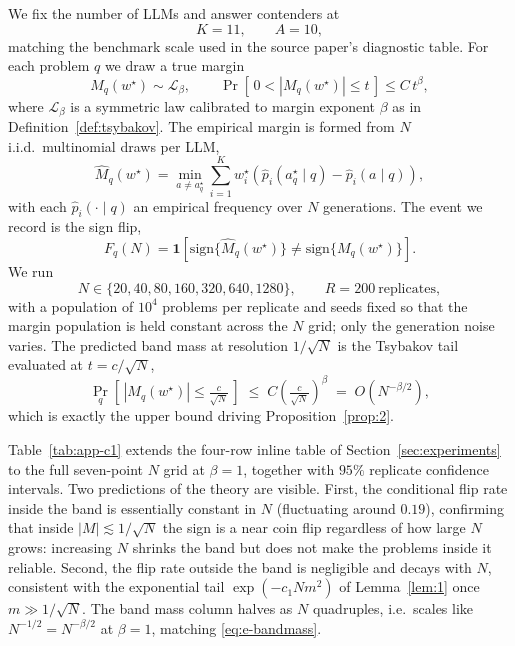 \documentclass{article} %
\providecommand{\phat}{\widehat{p}}
\providecommand{\Mhat}{\widehat{M}}
\providecommand{\wstar}{w^{\star}}
\providecommand{\sign}{\mathrm{sign}}
\begin{document}
We fix the number of LLMs and answer contenders at
\begin{equation}
\label{eq:e-c1-K}
K=11,
\qquad
A=10,
\end{equation}
matching the benchmark scale used in the source paper's diagnostic table.
For each problem $q$ we draw a true margin
\begin{equation}
\label{eq:e-c1-margin-law}
M_q(\wstar)\sim \mathcal{L}_\beta,
\qquad
\Pr\!\left[\,0<|M_q(\wstar)|\le t\,\right]\le C\,t^\beta,
\end{equation}
where $\mathcal{L}_\beta$ is a symmetric law calibrated to margin exponent
$\beta$ as in Definition~\ref{def:tsybakov}.  The empirical margin is formed
from $N$ i.i.d.\ multinomial draws per LLM,
\begin{equation}
\label{eq:e-c1-empirical}
\Mhat_q(\wstar)=\min_{a\ne a_q^\star}
\sum_{i=1}^K \wstar_i
\left(\phat_i(a_q^\star\mid q)-\phat_i(a\mid q)\right),
\end{equation}
with each $\phat_i(\cdot\mid q)$ an empirical frequency over $N$ generations.
The event we record is the sign flip,
\begin{equation}
\label{eq:e-c1-flip}
F_q(N)=
\mathbf 1\!\left[\sign\{\Mhat_q(\wstar)\}\ne\sign\{M_q(\wstar)\}\right].
\end{equation}
We run
\begin{equation}
\label{eq:e-c1-grid}
N\in\{20,40,80,160,320,640,1280\},
\qquad
R=200\ \text{replicates},
\end{equation}
with a population of $10^4$ problems per replicate and seeds fixed so that
the margin population is held constant across the $N$ grid; only the
generation noise varies.  The predicted band mass at resolution $1/\sqrt N$ is
the Tsybakov tail evaluated at $t=c/\sqrt N$,
\begin{equation}
\label{eq:e-bandmass}
\Pr_q\!\left[\,|M_q(\wstar)|\le \tfrac{c}{\sqrt N}\,\right]
\;\le\;
C\left(\tfrac{c}{\sqrt N}\right)^{\beta}
\;=\;
O\!\left(N^{-\beta/2}\right),
\end{equation}
which is exactly the upper bound driving Proposition~\ref{prop:2}.

Table~\ref{tab:app-c1} extends the four-row inline table of
Section~\ref{sec:experiments} to the full seven-point $N$ grid at
$\beta=1$, together with $95\%$ replicate confidence intervals.  Two
predictions of the theory are visible.  First, the conditional flip rate
inside the band is essentially constant in $N$ (fluctuating around $0.19$),
confirming that inside $|M|\lesssim 1/\sqrt N$ the sign is a near coin flip
regardless of how large $N$ grows: increasing $N$ shrinks the band but does
not make the problems inside it reliable.  Second, the flip rate outside the
band is negligible and decays with $N$, consistent with the exponential tail
$\exp(-c_1 N m^2)$ of Lemma~\ref{lem:1} once $m\gg 1/\sqrt N$.  The band mass
column halves as $N$ quadruples, i.e.\ scales like $N^{-1/2}=N^{-\beta/2}$ at
$\beta=1$, matching \eqref{eq:e-bandmass}.
\end{document}
